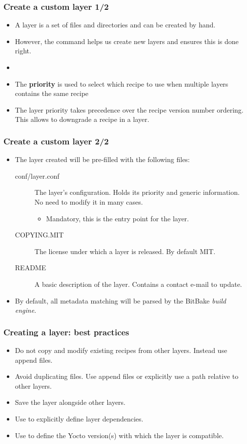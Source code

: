 \begin{frame}
  \frametitle{Create a custom layer 1/2}
  \begin{itemize}
    \item A layer is a set of files and directories and can be created
      by hand.
    \item However, the  command helps us create new
      layers and ensures this is done right.
    \item {}
    \item The \textbf{priority} is used to select which recipe to use when multiple layers contains the same recipe
    \item The layer priority takes precedence over the recipe version
          number ordering. This allows to downgrade a recipe in a layer.
  \end{itemize}
\end{frame}

\begin{frame}
  \frametitle{Create a custom layer 2/2}
  \begin{itemize}
    \item The layer created will be pre-filled with the following
          files:
    \begin{description}
      \item[conf/layer.conf] The layer's configuration. Holds its
        priority and generic information. No need to modify it in many
        cases.
        \begin{itemize}
          \item Mandatory, this is the entry point for the layer.
        \end{itemize}
      \item[COPYING.MIT] The license under which a layer is released.
        By default MIT.
      \item[README] A basic description of the layer. Contains a
        contact e-mail to update.
    \end{description}
    \item By default, all metadata matching 
          will be parsed by the BitBake \emph{build engine}.
  \end{itemize}
\end{frame}

\begin{frame}
  \frametitle{Creating a layer: best practices}
  \begin{itemize}
    \item Do not copy and modify existing recipes from other layers.
      Instead use append files.
    \item Avoid duplicating files. Use append files or explicitly use
      a path relative to other layers.
    \item Save the layer alongside other layers.
    \item Use  to explicitly define layer
      dependencies.
    \item Use  to define the Yocto version(s)
    with which the layer is compatible.
  \end{itemize}
\end{frame}
